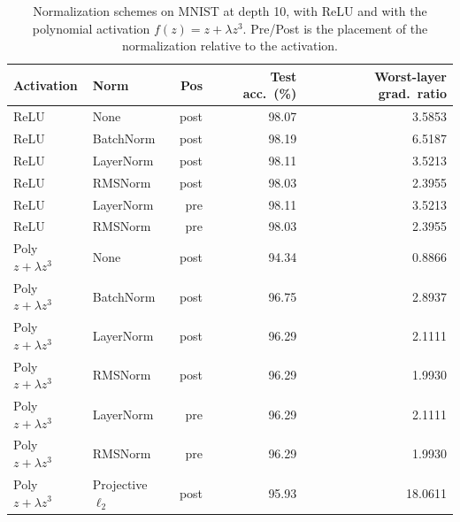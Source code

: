 \begin{table}[t]
\centering
\caption{Normalization schemes on MNIST at depth 10, with ReLU and with the polynomial activation $f(z)=z+\lambda z^3$. Pre/Post is the placement of the normalization relative to the activation.}
\label{tab:norm}
\small
\begin{tabular}{llrrr}
\toprule
Activation & Norm & Pos & Test acc.\ (\%) & Worst-layer grad.\ ratio \\
\midrule
ReLU & None & post & 98.07 & 3.5853 \\
ReLU & BatchNorm & post & 98.19 & 6.5187 \\
ReLU & LayerNorm & post & 98.11 & 3.5213 \\
ReLU & RMSNorm & post & 98.03 & 2.3955 \\
ReLU & LayerNorm & pre & 98.11 & 3.5213 \\
ReLU & RMSNorm & pre & 98.03 & 2.3955 \\
\midrule
Poly $z+\lambda z^3$ & None & post & 94.34 & 0.8866 \\
Poly $z+\lambda z^3$ & BatchNorm & post & 96.75 & 2.8937 \\
Poly $z+\lambda z^3$ & LayerNorm & post & 96.29 & 2.1111 \\
Poly $z+\lambda z^3$ & RMSNorm & post & 96.29 & 1.9930 \\
Poly $z+\lambda z^3$ & LayerNorm & pre & 96.29 & 2.1111 \\
Poly $z+\lambda z^3$ & RMSNorm & pre & 96.29 & 1.9930 \\
Poly $z+\lambda z^3$ & Projective $\ell_2$ & post & 95.93 & 18.0611 \\
\midrule
\bottomrule
\end{tabular}
\end{table}